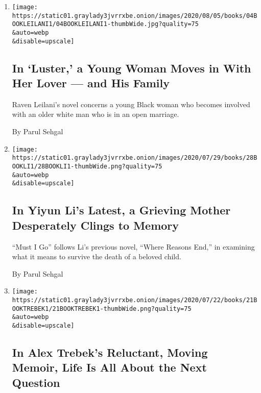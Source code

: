 \begin{enumerate}
\def\labelenumi{\arabic{enumi}.}
\item
  \href{/2020/08/04/books/review-luster-raven-leilani.html}{}

  \texttt{[image: https://static01.graylady3jvrrxbe.onion/images/2020/08/05/books/04BOOKLEILANI1/04BOOKLEILANI1-thumbWide.jpg?quality=75\\\&auto=webp\\\&disable=upscale]}

  \hypertarget{in-luster-a-young-woman-moves-in-with-her-lover--and-his-family}{%
  \subsection{In `Luster,' a Young Woman Moves in With Her Lover --- and
  His
  Family}\label{in-luster-a-young-woman-moves-in-with-her-lover--and-his-family}}

  Raven Leilani's novel concerns a young Black woman who becomes
  involved with an older white man who is in an open marriage.

  By Parul Sehgal
\item
  \href{/2020/07/28/books/review-must-i-go-yiyun-li.html}{}

  \texttt{[image: https://static01.graylady3jvrrxbe.onion/images/2020/07/29/books/28BOOKLI1/28BOOKLI1-thumbWide.png?quality=75\\\&auto=webp\\\&disable=upscale]}

  \hypertarget{in-yiyun-lis-latest-a-grieving-mother-desperately-clings-to-memory}{%
  \subsection{In Yiyun Li's Latest, a Grieving Mother Desperately Clings
  to
  Memory}\label{in-yiyun-lis-latest-a-grieving-mother-desperately-clings-to-memory}}

  ``Must I Go'' follows Li's previous novel, ``Where Reasons End,'' in
  examining what it means to survive the death of a beloved child.

  By Parul Sehgal
\item
  \href{/2020/07/21/books/review-answer-is-alex-trebek-jeopardy-memoir.html}{}

  \texttt{[image: https://static01.graylady3jvrrxbe.onion/images/2020/07/22/books/21BOOKTREBEK1/21BOOKTREBEK1-thumbWide.png?quality=75\\\&auto=webp\\\&disable=upscale]}

  \hypertarget{in-alex-trebeks-reluctant-moving-memoir-life-is-all-about-the-next-question}{%
  \subsection{In Alex Trebek's Reluctant, Moving Memoir, Life Is All
  About the Next
  Question}\label{in-alex-trebeks-reluctant-moving-memoir-life-is-all-about-the-next-question}}


\end{enumerate}
